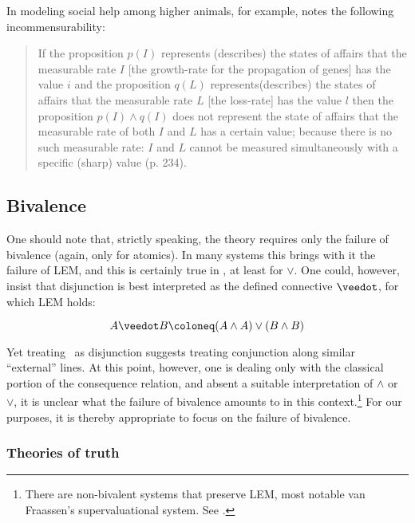 In modeling social help among higher animals, for example, \cite{Weingartner2004} notes the following incommensurability:

\begin{quote}
If the proposition $p(I)$ represents (describes) the states of affairs that the measurable rate $I$ [the growth-rate for the propagation of genes] has the value $i$ and the proposition $q(L)$ represents(describes) the states of affairs that the measurable rate $L$ [the loss-rate] has the value $l$ then the proposition $p(I) \wedge q(I)$ does not represent the state of affairs that the measurable rate of both $I$ and $L$ has a certain value; because there is no such measurable rate: $I$ and $L$ cannot be measured simultaneously with a specific (sharp) value (p. 234).
\end{quote}

\noindent 

\subsection{Bivalence}\label{bivalence}

One should note that, strictly speaking, the theory requires only the failure of bivalence (again, only for atomics). In many systems this brings with it the failure of LEM, and this is certainly true in \GO, at least for $\vee$. One could, however, insist that disjunction is best interpreted as the defined connective $\ExtDisj$, for which LEM holds:

\[ A \ExtDisj B \Defined (A \wedge A) \vee (B \wedge B) \]

Yet treating \ExtDisj\ as disjunction suggests treating conjunction along similar ``external'' lines. At this point, however, one is dealing only with the classical portion of the consequence relation, and absent a suitable interpretation of $\wedge$ or $\vee$, it is unclear what the failure of bivalence amounts to in this context.\footnote{There are non-bivalent systems that preserve LEM, most notable van Fraassen's supervaluational system. See \cite[pp40-47]{vanFraassen1991}.} For our purposes, it is thereby appropriate to focus on the failure of bivalence.

\subsubsection{Theories of truth}\label{theoriesOfTruth}

